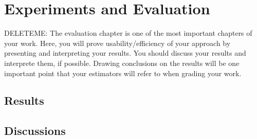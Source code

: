 \chapter{Experiments and Evaluation}
\label{evaluation}
DELETEME: The evaluation chapter is one of the most important chapters of your work. Here, you will prove usability/efficiency of your approach by presenting and interpreting your results. You should discuss your results and interprete them, if possible. Drawing conclusions on the results will be one important point that your estimators will refer to when grading your work.

\section{Results}
\label{results}

\section{Discussions}
\label{discussions}